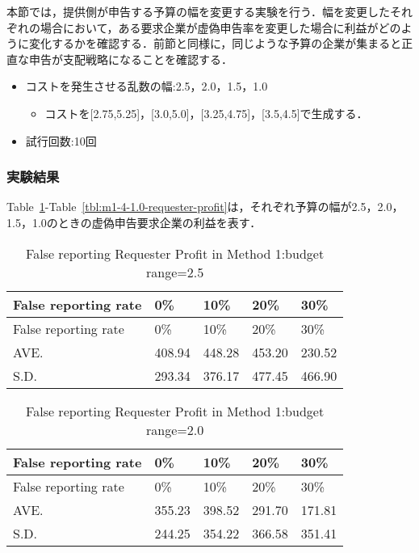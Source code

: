 本節では，提供側が申告する予算の幅を変更する実験を行う．幅を変更したそれぞれの場合において，ある要求企業が虚偽申告率を変更した場合に利益がどのように変化するかを確認する．前節と同様に，同じような予算の企業が集まると正直な申告が支配戦略になることを確認する．

\begin{itemize}
\tightlist
\item
  コストを発生させる乱数の幅:2.5，2.0，1.5，1.0

  \begin{itemize}
  \tightlist
  \item
    コストを{[}2.75,5.25{]}，{[}3.0,5.0{]}，{[}3.25,4.75{]}，{[}3.5,4.5{]}で生成する．
  \end{itemize}
\item
  試行回数:10回
\end{itemize}

\hypertarget{ux5b9fux9a13ux7d50ux679c-2}{%
\subsubsection{実験結果}\label{ux5b9fux9a13ux7d50ux679c-2}}

Table~\ref{tbl:m1-4-2.5-requester-profit}-Table~\ref{tbl:m1-4-1.0-requester-profit}は，それぞれ予算の幅が2.5，2.0，1.5，1.0のときの虚偽申告要求企業の利益を表す．

\hypertarget{tbl:m1-4-2.5-requester-profit}{}
\begin{longtable}[H]{@{}lllll@{}}
\caption{\label{tbl:m1-4-2.5-requester-profit}False reporting Requester
Profit in Method 1:budget range=2.5}\tabularnewline
\toprule
False reporting rate & 0\% & 10\% & 20\% & 30\%\tabularnewline
\midrule
\endfirsthead
\toprule
False reporting rate & 0\% & 10\% & 20\% & 30\%\tabularnewline
\midrule
\endhead
AVE. & 408.94 & 448.28 & 453.20 & 230.52\tabularnewline
S.D. & 293.34 & 376.17 & 477.45 & 466.90\tabularnewline
\bottomrule
\end{longtable}

\hypertarget{tbl:m1-4-2.0-requester-profit}{}
\begin{longtable}[H]{@{}lllll@{}}
\caption{\label{tbl:m1-4-2.0-requester-profit}False reporting Requester
Profit in Method 1:budget range=2.0}\tabularnewline
\toprule
False reporting rate & 0\% & 10\% & 20\% & 30\%\tabularnewline
\midrule
\endfirsthead
\toprule
False reporting rate & 0\% & 10\% & 20\% & 30\%\tabularnewline
\midrule
\endhead
AVE. & 355.23 & 398.52 & 291.70 & 171.81\tabularnewline
S.D. & 244.25 & 354.22 & 366.58 & 351.41\tabularnewline
\bottomrule
\end{longtable}

